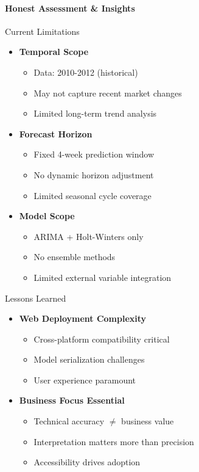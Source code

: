 { 
	\framesubtitle{Honest Assessment \& Insights}
	
	\begin{block}{Current Limitations}
		\begin{itemize}
			\item \textbf{Temporal Scope}
			\begin{itemize}
				\item Data: 2010-2012 (historical)
				\item May not capture recent market changes
				\item Limited long-term trend analysis
			\end{itemize}
			
			\item \textbf{Forecast Horizon}
			\begin{itemize}
				\item Fixed 4-week prediction window
				\item No dynamic horizon adjustment
				\item Limited seasonal cycle coverage
			\end{itemize}
			
			\item \textbf{Model Scope}
			\begin{itemize}
				\item ARIMA + Holt-Winters only
				\item No ensemble methods
				\item Limited external variable integration
			\end{itemize}
		\end{itemize}
	\end{block}
	
	\begin{block}{Lessons Learned}
		\begin{itemize}
			\item \textbf{Web Deployment Complexity}
			\begin{itemize}
				\item Cross-platform compatibility critical
				\item Model serialization challenges
				\item User experience paramount
			\end{itemize}
			
			\item \textbf{Business Focus Essential}
			\begin{itemize}
				\item Technical accuracy $\neq$ business value
				\item Interpretation matters more than precision
				\item Accessibility drives adoption
			\end{itemize}
			

\end{itemize}
\end{block}}
